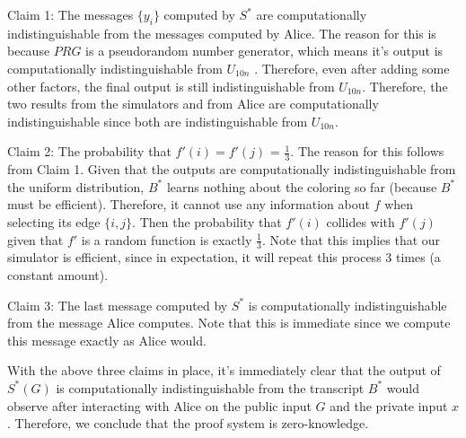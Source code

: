 \documentclass{article}
\begin{document}
\begin{enumerate}[noitemsep,topsep=\mdcompacttopsep,label=\alph*.]
\begin{mdbmarginx}{1ex}{0pt}{1ex}{0pt}
Claim 1: The messages $\{y_i\}$ computed by $S^*$ are computationally indistinguishable from the
messages computed by Alice. The reason for this is because $PRG$ is a pseudorandom number generator,
which means it's output is computationally indistinguishable from $U_{10n}$ . Therefore, even after adding some
other factors, the final output is still indistinguishable from $U_{10n}$. Therefore, the two
results from the simulators and from Alice are computationally indistinguishable since both
are indistinguishable from $U_{10n}$.%

Claim 2: The probability that $f'(i) = f'(j)$ = $\frac{1}{3}$. The reason for this follows
from Claim 1. Given that the outputs are computationally indistinguishable from the uniform distribution, 
$B^*$ learns nothing about the coloring so far (because $B^*$ must be efficient). Therefore, it cannot use any information about
$f$ when selecting its edge $\{i,j\}$. Then the probability that $f'(i)$ collides with $f'(j)$ given
that $f'$ is a random function is exactly $\frac{1}{3}$. Note that this implies that our simulator
is efficient, since in expectation, it will repeat this process $3$ times (a constant amount).%

Claim 3: The last message computed by $S^*$ is computationally indistinguishable from the message
Alice computes. Note that this is immediate since we compute this message exactly as Alice would.%

With the above three claims in place, it's immediately clear that the output of $S^*(G)$ is
computationally indistinguishable from the transcript $B^*$ would observe after interacting with 
Alice on the public input $G$ and the private input $x$. Therefore, we conclude that the 
proof system is zero-knowledge.%
\end{mdbmarginx}%


\end{enumerate}
\end{document}
